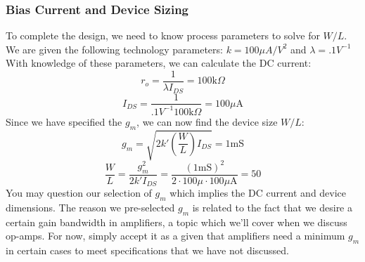 \subsubsection{Bias Current and Device Sizing}
To complete the design, we need to know process parameters to solve for $W/L$.  We are given the following technology parameters: $k = 100 \mu A/V^2$ and $\lambda = .1V^{-1}$
With knowledge of these parameters, we can calculate the DC current: 
    \begin{equation} 
        {r_o} = \frac{1}{{\lambda {I_{DS}}}} = 100\mathrm{k}\Omega 
    \end{equation}
    \begin{equation} 
        {I_{DS}} = \frac{1}{{.1{V^{ - 1}} 100\mathrm{k}\Omega }} = 100\mu \mathrm{A}
    \end{equation}
Since we have specified the $g_m$, we can now find the device size $W/L$:
    \begin{equation} 
        {g_m} = \sqrt {2k'\left( {\frac{W}{L}} \right){I_{DS}}}  = 1\mathrm{mS} 
    \end{equation}
    \begin{equation} 
        \frac{W}{L} = \frac{{g_m^2}}{{2k'{I_{DS}}}} = \frac{{{{(1\mathrm{mS})}^2}}}{{2 \cdot 100\mu \cdot 100\mu \mathrm{A}}} = 50 
    \end{equation}
You may question our selection of $g_m$ which implies the DC current and device dimensions.  The reason we pre-selected $g_m$ is related to the fact that we desire a certain gain bandwidth in amplifiers, a topic which we'll cover when we discuss op-amps.  For now, simply accept it as a given that amplifiers need a minimum $g_m$ in certain cases to meet specifications that we have not discussed.
